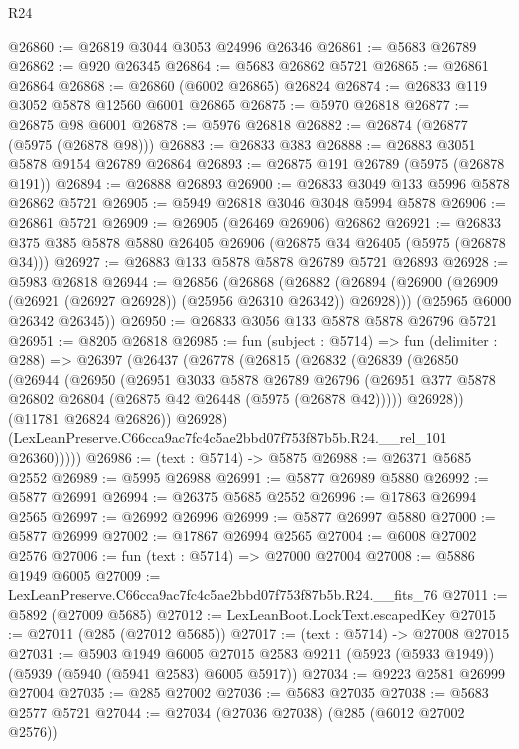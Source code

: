 \begin{lexlean}{R24}
\begin{coremodule}
@26860 := @26819 @3044 @3053 @24996 @26346
@26861 := @5683 @26789
@26862 := @920 @26345
@26864 := @5683 @26862 @5721
@26865 := @26861 @26864
@26868 := @26860 (@6002 @26865) @26824
@26874 := @26833 @119 @3052 @5878 @12560 @6001 @26865
@26875 := @5970 @26818
@26877 := @26875 @98 @6001
@26878 := @5976 @26818
@26882 := @26874 (@26877 (@5975 (@26878 @98)))
@26883 := @26833 @383
@26888 := @26883 @3051 @5878 @9154 @26789 @26864
@26893 := @26875 @191 @26789 (@5975 (@26878 @191))
@26894 := @26888 @26893
@26900 := @26833 @3049 @133 @5996 @5878 @26862 @5721
@26905 := @5949 @26818 @3046 @3048 @5994 @5878
@26906 := @26861 @5721
@26909 := @26905 (@26469 @26906) @26862
@26921 := @26833 @375 @385 @5878 @5880 @26405 @26906 (@26875 @34 @26405 (@5975 (@26878 @34)))
@26927 := @26883 @133 @5878 @5878 @26789 @5721 @26893
@26928 := @5983 @26818
@26944 := @26856
    (@26868
      (@26882 (@26894 (@26900 (@26909 (@26921 (@26927 @26928)) (@25956 @26310 @26342)) @26928)))
      (@25965 @6000 @26342 @26345))
@26950 := @26833 @3056 @133 @5878 @5878 @26796 @5721
@26951 := @8205 @26818
@26985 := fun (subject : @5714) =>
  fun (delimiter : @288) =>
  @26397
    (@26437
      (@26778
        (@26815
          (@26832
            (@26839
              (@26850
                (@26944
                  (@26950
                    (@26951
                      @3033
                      @5878
                      @26789
                      @26796
                      (@26951 @377 @5878 @26802 @26804 (@26875 @42 @26448 (@5975 (@26878 @42)))))
                    @26928))
                (@11781 @26824 @26826))
              @26928)
            (LexLeanPreserve.C66cca9ac7fc4c5ae2bbd07f753f87b5b.R24.__rel_101 @26360)))))
@26986 := (text : @5714) -> @5875
@26988 := @26371 @5685 @2552
@26989 := @5995 @26988
@26991 := @5877 @26989 @5880
@26992 := @5877 @26991
@26994 := @26375 @5685 @2552
@26996 := @17863 @26994 @2565
@26997 := @26992 @26996
@26999 := @5877 @26997 @5880
@27000 := @5877 @26999
@27002 := @17867 @26994 @2565
@27004 := @6008 @27002 @2576
@27006 := fun (text : @5714) => @27000 @27004
@27008 := @5886 @1949 @6005
@27009 := LexLeanPreserve.C66cca9ac7fc4c5ae2bbd07f753f87b5b.R24.__fits_76
@27011 := @5892 (@27009 @5685)
@27012 := LexLeanBoot.LockText.escapedKey
@27015 := @27011 (@285 (@27012 @5685))
@27017 := (text : @5714) -> @27008 @27015
@27031 := @5903
    @1949
    @6005
    @27015
    @2583
    @9211
    (@5923 (@5933 @1949))
    (@5939 (@5940 (@5941 @2583) @6005 @5917))
@27034 := @9223 @2581 @26999 @27004
@27035 := @285 @27002
@27036 := @5683 @27035
@27038 := @5683 @2577 @5721
@27044 := @27034 (@27036 @27038) (@285 (@6012 @27002 @2576))

\end{coremodule}
\end{lexlean}
